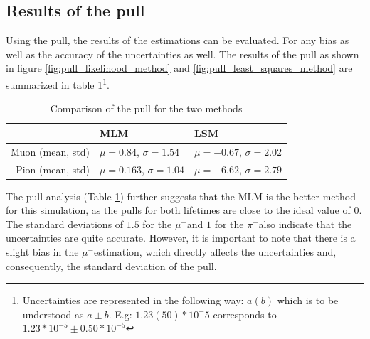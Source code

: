 \documentclass[11pt, a4paper, oneside]{book}
\newcommand{\pion}{$\pi^{-}$}
\newcommand{\muon}{$\mu^{-}$}
\begin{document}
\subsection{Results of the pull} 

Using the pull, the results of the estimations can be evaluated. For any bias as well as the accuracy of the uncertainties as well. The results of the pull as shown in figure \ref{fig:pull_likelihood_method} and \ref{fig:pull_least_squares_method} are summarized in table \ref{tab:pull_results}\footnote{Uncertainties are represented in the following way: $a(b)$ which is to be understood as $a \pm b$. E.g: $1.23(50)*10^-5$ corresponds to $1.23*10^{-5} \pm 0.50 * 10^{-5}$}.


\begin{table}[H]
\centering
  \caption{Comparison of the pull for the two methods}
  \label{tab:pull_results}
  \begin{tabular}{r|ll}
                   & MLM                                & LSM \\ \hline
  Muon (mean, std) & $\mu = 0.84$, $\sigma = 1.54 $     & $\mu = -0.67$, $\sigma = 2.02$  \\
  Pion (mean, std) & $\mu = 0.163$, $\sigma = 1.04$     & $\mu = -6.62$, $\sigma = 2.79$ 
  \end{tabular}
\end{table}

The pull analysis (Table \ref{tab:pull_results}) further suggests that the MLM is the better method for this simulation, as the pulls for both lifetimes are close to the ideal value of 0. The standard deviations of $1.5$ for the \muon and $1$ for the \pion also indicate that the uncertainties are quite accurate. However, it is important to note that there is a slight bias in the \muon estimation, which directly affects the uncertainties and, consequently, the standard deviation of the pull.
\end{document}
